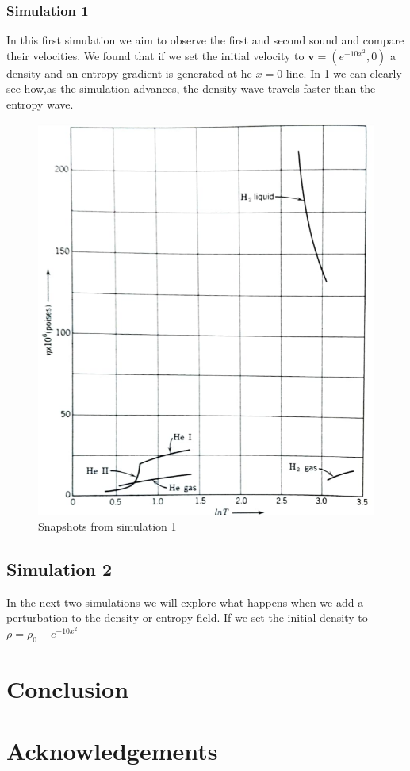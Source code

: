 \documentclass{article}
\begin{document}
\subsubsection{Simulation 1}
In this first simulation we aim to observe the first and second sound and compare their velocities.
We found that if we set the initial velocity to \(\mathbf{v} = (e^{-10x^2}, 0)\) a density and an entropy gradient is generated at he \(x=0\) line. 
In \ref{sim1} we can clearly see how,as the simulation advances, the density wave travels faster than the entropy wave.
\begin{figure}
    \includegraphics{Viscosity.png}
    \caption{Snapshots from simulation 1}
    \label{sim1}
\end{figure}

\subsection{Simulation 2}
In the next two simulations we will explore what happens when we add a perturbation to the density or entropy field.
If we set the initial density to \(\rho = \rho_0 + e^{-10x^2}\)

\section{Conclusion}

 
\section{Acknowledgements}



\end{document}

